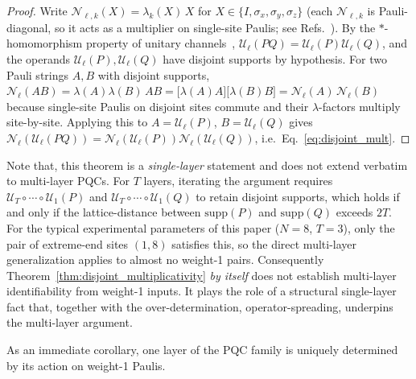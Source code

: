 \documentclass[%
 reprint,
superscriptaddress,
 amsmath,amssymb,
 aps,
]{revtex4-2}
\begin{document}
\begin{proof}
Write $\mathcal{N}_{\ell,k}(X) = \lambda_k(X)\,X$ for $X\in\{I,\sigma_x,\sigma_y,\sigma_z\}$ (each $\mathcal{N}_{\ell,k}$ is Pauli-diagonal, so it acts as a multiplier on single-site Paulis; see Refs.~\cite{nielsen2002simple,magesan2012characterizing,flammia2020pauli}). By the $*$-homomorphism property of unitary channels~\cite{nielsen2010quantum,watrous2018theory}, $\mathcal{U}_\ell(PQ)=\mathcal{U}_\ell(P)\mathcal{U}_\ell(Q)$, and the operands $\mathcal{U}_\ell(P),\mathcal{U}_\ell(Q)$ have disjoint supports by hypothesis. For two Pauli strings $A,B$ with disjoint supports, $\mathcal{N}_\ell(AB) = \lambda(A)\lambda(B)\,AB = \bigl[\lambda(A)A\bigr]\bigl[\lambda(B)B\bigr] = \mathcal{N}_\ell(A)\,\mathcal{N}_\ell(B)$ because single-site Paulis on disjoint sites commute and their $\lambda$-factors multiply site-by-site. Applying this to $A=\mathcal{U}_\ell(P)$, $B=\mathcal{U}_\ell(Q)$ gives $\mathcal{N}_\ell(\mathcal{U}_\ell(PQ))=\mathcal{N}_\ell(\mathcal{U}_\ell(P))\mathcal{N}_\ell(\mathcal{U}_\ell(Q))$, i.e.\ Eq.~\eqref{eq:disjoint_mult}.
\end{proof}

Note that, this theorem is a \emph{single-layer} statement and does not extend verbatim to multi-layer PQCs. For $T$ layers, iterating the argument requires $\mathcal{U}_T\circ\cdots\circ\mathcal{U}_1(P)$ and $\mathcal{U}_T\circ\cdots\circ\mathcal{U}_1(Q)$ to retain disjoint supports, which holds if and only if the lattice-distance between $\mathrm{supp}(P)$ and $\mathrm{supp}(Q)$ exceeds $2T$. For the typical experimental parameters of this paper ($N=8$, $T=3$), only the pair of extreme-end sites $(1,8)$ satisfies this, so the direct multi-layer generalization applies to almost no weight-1 pairs. Consequently Theorem~\ref{thm:disjoint_multiplicativity} \emph{by itself} does not establish multi-layer identifiability from weight-1 inputs. It plays the role of a structural single-layer fact that, together with the over-determination, operator-spreading, underpins the multi-layer argument.

As an immediate corollary, one layer of the PQC family is uniquely determined by its action on weight-1 Paulis. 
\end{document}
